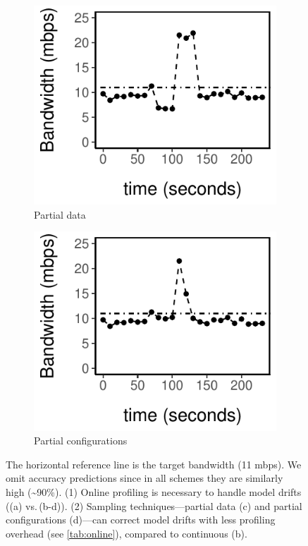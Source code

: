 \begin{figure}
  \\
  \vspace{1.5em}
  \begin{subfigure}[t]{0.49\columnwidth}
    \includegraphics[width=\textwidth]{figures/online3.pdf}
    \caption{Partial data}
    \label{fig:online-partial}
  \end{subfigure}
  \hfill
  \begin{subfigure}[t]{0.49\columnwidth}
    \includegraphics[width=\textwidth]{figures/online4.pdf}
    \caption{Partial configurations}
    \label{fig:online-trigger}
  \end{subfigure}
  \caption{The horizontal reference line is the target bandwidth (11 mbps). We omit accuracy predictions  since in all schemes they are similarly high (\textasciitilde 90\%). (1) Online profiling is necessary to handle model drifts ((a) vs.\,(b-d)). (2) Sampling techniques---partial data (c) and partial configurations (d)---can correct model drifts with less profiling overhead (see \autoref{tab:online}), compared to continuous (b).}
  \label{fig:online-tricks}
\end{figure}


